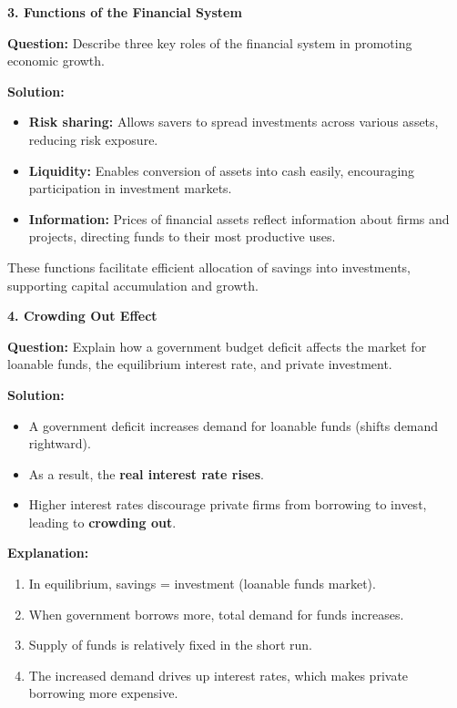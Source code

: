 \documentclass[12pt]{article}
\begin{document}
\textbf{3. Functions of the Financial System}

\textbf{Question:}  
Describe three key roles of the financial system in promoting economic growth.

\textbf{Solution:}  
\begin{itemize}
    \item \textbf{Risk sharing:} Allows savers to spread investments across various assets, reducing risk exposure.
    \item \textbf{Liquidity:} Enables conversion of assets into cash easily, encouraging participation in investment markets.
    \item \textbf{Information:} Prices of financial assets reflect information about firms and projects, directing funds to their most productive uses.
\end{itemize}
These functions facilitate efficient allocation of savings into investments, supporting capital accumulation and growth.



\textbf{4. Crowding Out Effect}

\textbf{Question:}  
Explain how a government budget deficit affects the market for loanable funds, the equilibrium interest rate, and private investment.

\textbf{Solution:}  
\begin{itemize}
    \item A government deficit increases demand for loanable funds (shifts demand rightward).
    \item As a result, the \textbf{real interest rate rises}.
    \item Higher interest rates discourage private firms from borrowing to invest, leading to \textbf{crowding out}.
\end{itemize}

\textbf{Explanation:}
\begin{enumerate}
    \item In equilibrium, savings = investment (loanable funds market).
    \item When government borrows more, total demand for funds increases.
    \item Supply of funds is relatively fixed in the short run.
    \item The increased demand drives up interest rates, which makes private borrowing more expensive.
\end{enumerate}
\end{document}

